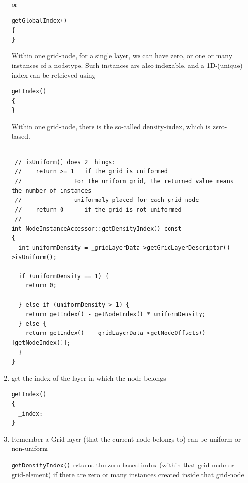 \begin{enumerate}
or  
\begin{verbatim}
getGlobalIndex()
{
}
\end{verbatim}  
 
Within one grid-node, for a single layer, we can have zero, or one or many
instances of a nodetype. Such instances are also indexable, and a 1D-(unique) index can be retrieved using
\begin{verbatim}
getIndex()
{
}
\end{verbatim}

Within one grid-node, there is the so-called density-index, which is zero-based.
\begin{verbatim}

 // isUniform() does 2 things:
 //    return >= 1   if the grid is uniformed
 //               For the uniform grid, the returned value means the number of instances 
 //               uniformaly placed for each grid-node
 //    return 0      if the grid is not-uniformed
 //          
int NodeInstanceAccessor::getDensityIndex() const
{
  int uniformDensity = _gridLayerData->getGridLayerDescriptor()->isUniform();

  if (uniformDensity == 1) {
    return 0;

  } else if (uniformDensity > 1) {
    return getIndex() - getNodeIndex() * uniformDensity;
  } else {
    return getIndex() - _gridLayerData->getNodeOffsets()[getNodeIndex()];
  }
}
\end{verbatim} 
 
 
  
  \item get the index of the layer in which the node belongs
  
\begin{verbatim}
getIndex()
{
  _index;
}
\end{verbatim}  
  
  \item Remember a Grid-layer (that the current node belongs to) can be uniform
  or non-uniform
  
  \verb!getDensityIndex()! returns the zero-based index (within that grid-node or grid-element)
  if there are zero or many instances created inside that grid-node
  
%     
  
\end{enumerate}


